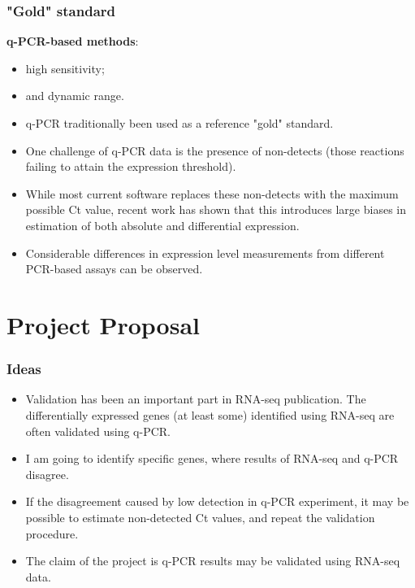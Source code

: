 \documentclass{beamer}
\begin{document}
\begin{frame}
\frametitle{"Gold" standard}
{\bf q-PCR-based methods}:
\begin{itemize}
\item high sensitivity; \pause
\item and dynamic range. \pause
\item q-PCR traditionally been used as a reference "gold" standard. \pause
\end{itemize} 
\vspace{0.3cm}
\begin{itemize}
\item One challenge of q-PCR data is the presence of non-detects (those reactions failing to attain the expression threshold).\pause
\item While most current software replaces these non-detects with  the  maximum  possible  Ct  value,  recent  work  has  shown  that this introduces large biases in estimation of both absolute and differential expression.\cite{McCall} \pause
\item Considerable differences in expression level measurements from different PCR-based assays can be observed.
\end{itemize}
\end{frame}


\section{Project Proposal}
\begin{frame}
\frametitle{Ideas}
\begin{itemize}
\item Validation has been an important part in RNA-seq publication. The differentially expressed genes (at least some) identified using RNA-seq are often validated using q-PCR. \pause
\item I am going to identify specific genes, where results of RNA-seq and q-PCR disagree.\pause
\item If the disagreement caused by low detection in q-PCR experiment, it may be possible to estimate non-detected Ct values, and  repeat the validation procedure. \pause
\item The claim of the project is q-PCR results may be validated using RNA-seq data. 
\end{itemize}  
\end{frame}
\end{document}

